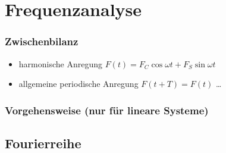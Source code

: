 \documentclass[hyperref={pdfpagemode=FullScreen, colorlinks=false}]{beamer}
\begin{document}
\maketitle

\section{Frequenzanalyse}

\begin{frame}
\frametitle{Zwischenbilanz}



\begin{itemize}[<+->]
 \item harmonische Anregung $F(t)=  F_C\cos\omega t + F_S\sin\omega t$ {\Large \color{green}\checkmark}
 \item allgemeine periodische Anregung $F(t+T)=F(t)$ \dots
\end{itemize}
\end{frame}

\begin{frame}
\frametitle{Vorgehensweise \normalsize{(nur für lineare Systeme)}}



\end{frame}


\subsection{Fourierreihe}
\end{document}
